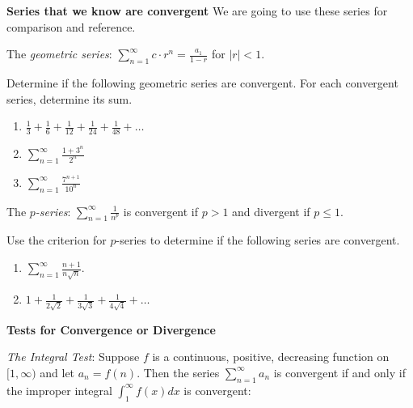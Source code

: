 \documentclass[12 pt]{article}
\begin{document}
{\bf Series that we know are convergent} We are going to use these series for comparison and reference.


The \textit{geometric series}: ${\displaystyle \sum_{n=1}^{\infty} c \cdot r^{n}  = \frac{a_{1}}{1-r}}$ for $|r| < 1$. 

Determine if the following geometric series are convergent. For each convergent series, determine its sum.

\begin{enumerate}

\item ${\displaystyle \frac{1}{3}+\frac{1}{6}+\frac{1}{12} + \frac{1}{24} + \frac{1}{48} + \dots}$


\item ${\displaystyle \sum_{n=1}^{\infty} \frac{1+3^{n}}{2^{n}}}$


\item ${\displaystyle \sum_{n=1}^{\infty} \frac{7^{n+1}}{10^{n}}}$


\end{enumerate}

The \textit{$p$-series}: ${\displaystyle \sum_{n=1}^{\infty} \frac{1}{n^p}}$ is convergent if $p>1$ and divergent if $p \leq 1$.

Use the criterion for $p$-series to determine if the following series are convergent.

\begin{enumerate}

\item ${\displaystyle \sum_{n=1}^{\infty} \frac{n+1}{n\sqrt{n}}}$. 


\item ${\displaystyle 1 + \frac{1}{2\sqrt{2}} + \frac{1}{3\sqrt{3}} + \frac{1}{4\sqrt{4}} + \dots }$


\end{enumerate}

\newpage

{\bf Tests for Convergence or Divergence}

 \textit{The Integral Test}: Suppose $f$ is a continuous, positive, decreasing function on $[ 1,\infty )$ and let $a_{n}=f(n)$. Then the series ${\displaystyle \sum_{n=1}^{\infty} a_{n}}$ is convergent if and only if the improper integral ${\displaystyle \int_{1}^{\infty} f(x) dx}$ is convergent:
\end{document}
